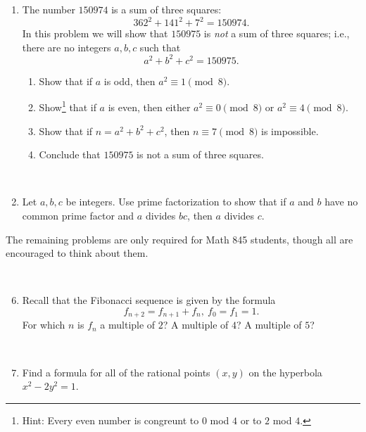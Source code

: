 \documentclass{amsart}
\begin{document}
\begin{enumerate}
\newpage


\item The number $150974$ is a sum of three squares:
\[ 362^2 + 141^2 +7^2 =150974.\]
In this problem we will show that $150975$ is \emph{not} a sum of three squares; i.e., there are no integers $a,b,c$ such that
\[ a^2 + b^2 + c^2 = 150975.\]
\begin{enumerate}
\item Show that if $a$ is odd, then $a^2\equiv 1 \pmod 8$.
\item Show\footnote{Hint: Every even number is congreunt to $0$ mod $4$ or to $2$ mod $4$.} that if $a$ is even, then either $a^2 \equiv 0 \pmod 8$ or $a^2 \equiv 4 \pmod 8$.
\item Show that if $n=a^2+b^2+c^2$, then $n \equiv 7 \pmod 8$ is impossible.
\item Conclude that $150975$ is {not} a sum of three squares.
\end{enumerate}

\

\item  Let $a,b,c$ be integers. Use prime factorization to show that if $a$ and $b$ have no common prime factor and $a$ divides $bc$, then $a$ divides $c$.

\end{enumerate}

\noindent  \hrulefill

\noindent The remaining problems are only required for Math 845 students, though all are encouraged to think about them.

\

\begin{enumerate}\setcounter{enumi}{5}



\item Recall that the Fibonacci sequence is given by the formula
\[ f_{n+2} = f_{n+1} + f_n, \ f_0=f_1=1.\]
For which $n$ is $f_n$ a multiple of $2$? A multiple of $4$? A multiple of $5$?

\

\item Find a formula for all of the rational points $(x,y)$ on the hyperbola $x^2-2y^2=1$. 

\end{enumerate}
\end{document}
